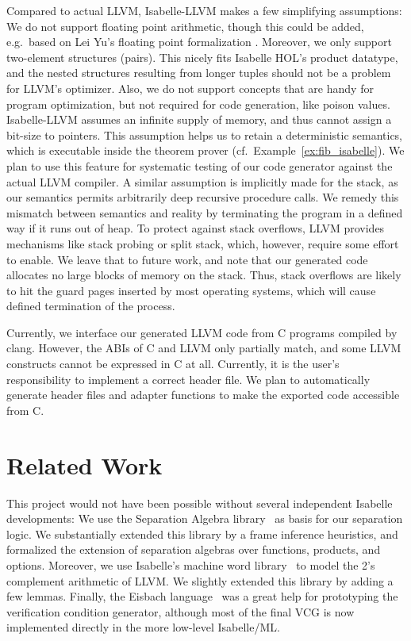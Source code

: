 \documentclass[a4paper,USenglish,cleveref, autoref]{lipics-v2019}
\begin{document}
Compared to actual LLVM, Isabelle-LLVM makes a few simplifying assumptions: 
We do not support floating point arithmetic, though this could be added, e.g.~based on Lei Yu's floating point formalization \cite{Yu13}.
Moreover, we only support two-element structures (pairs). This nicely fits Isabelle HOL's product datatype, and the nested structures 
resulting from longer tuples should not be a problem for LLVM's optimizer.
Also, we do not support concepts that are handy for program optimization, but not required for code generation, like poison values.
Isabelle-LLVM assumes an infinite supply of memory, and thus cannot assign a bit-size to pointers. 
This assumption helps us to retain a deterministic semantics, which is executable inside the theorem prover (cf.~Example~\ref{ex:fib_isabelle}). 
We plan to use this feature for systematic testing of our code generator against the actual LLVM compiler. 
A similar assumption is implicitly made for the stack, as our semantics permits arbitrarily deep recursive procedure calls.
We remedy this mismatch between semantics and reality by terminating the program in a defined way if it runs out of heap.
To protect against stack overflows, LLVM provides mechanisms like stack probing or split stack, which, however, require some effort to enable. 
We leave that to future work, and note that our generated code allocates no large blocks of memory on the stack. 
Thus, stack overflows are likely to hit the guard pages inserted by most operating systems, which will cause defined termination of the process.

Currently, we interface our generated LLVM code from C programs compiled by clang. However, the ABIs of C and LLVM only partially match, 
and some LLVM constructs cannot be expressed in C at all.
Currently, it is the user's responsibility to implement a correct header file. 
We plan to automatically generate header files and adapter functions to make the exported code accessible from C.


\section{Related Work}\label{sec:related_work}
This project would not have been possible without several independent Isabelle developments:
We use the Separation Algebra library~\cite{KKB12_afp,KKB12} as basis for our separation logic. We substantially extended this library by a 
frame inference heuristics, and formalized the extension of separation algebras over functions, products, and options. 
Moreover, we use Isabelle's machine word library~\cite{Word_Lib-AFP} to model the 2's complement arithmetic of LLVM. We slightly extended this library by adding a few lemmas. Finally, the Eisbach language~\cite{MMW16} was a great help for prototyping the verification condition generator, although most of the 
final VCG is now implemented directly in the more low-level Isabelle/ML.
\end{document}
